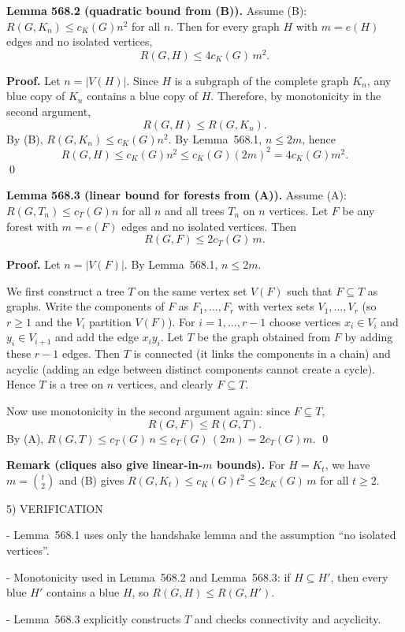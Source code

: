 \medskip

\textbf{Lemma 568.2 (quadratic bound from (B)).}
Assume (B): $R(G,K_n)\le c_K(G)n^2$ for all $n$. Then for every graph $H$ with $m=e(H)$ edges and no isolated vertices,
\[
R(G,H) \le 4c_K(G)\,m^2.
\]

\textbf{Proof.}
Let $n=|V(H)|$. Since $H$ is a subgraph of the complete graph $K_n$, any blue copy of $K_n$ contains a blue copy of $H$. Therefore, by monotonicity in the second argument,
\[
R(G,H) \le R(G,K_n).
\]
By (B), $R(G,K_n)\le c_K(G)n^2$. By Lemma~568.1, $n\le 2m$, hence
\[
R(G,H) \le c_K(G)n^2 \le c_K(G)(2m)^2 = 4c_K(G)m^2.
\]
\qed

\medskip

\textbf{Lemma 568.3 (linear bound for forests from (A)).}
Assume (A): $R(G,T_n)\le c_T(G)n$ for all $n$ and all trees $T_n$ on $n$ vertices. Let $F$ be any forest with $m=e(F)$ edges and no isolated vertices. Then
\[
R(G,F) \le 2c_T(G)\,m.
\]

\textbf{Proof.}
Let $n=|V(F)|$. By Lemma~568.1, $n\le 2m$.

We first construct a tree $T$ on the same vertex set $V(F)$ such that $F\subseteq T$ as graphs. Write the components of $F$ as $F_1,\dots,F_r$ with vertex sets $V_1,\dots,V_r$ (so $r\ge 1$ and the $V_i$ partition $V(F)$). For $i=1,\dots,r-1$ choose vertices $x_i\in V_i$ and $y_i\in V_{i+1}$ and add the edge $x_iy_i$. Let $T$ be the graph obtained from $F$ by adding these $r-1$ edges. Then $T$ is connected (it links the components in a chain) and acyclic (adding an edge between distinct components cannot create a cycle). Hence $T$ is a tree on $n$ vertices, and clearly $F\subseteq T$.

Now use monotonicity in the second argument again: since $F\subseteq T$,
\[
R(G,F) \le R(G,T).
\]
By (A), $R(G,T)\le c_T(G)\,n \le c_T(G)\,(2m)=2c_T(G)m$.
\qed

\medskip

\textbf{Remark (cliques also give linear-in-$m$ bounds).}
For $H=K_t$, we have $m=\binom t2$ and (B) gives $R(G,K_t)\le c_K(G)t^2\le 2c_K(G)\,m$ for all $t\ge 2$.

5) VERIFICATION

- Lemma~568.1 uses only the handshake lemma and the assumption ``no isolated vertices''.

- Monotonicity used in Lemma~568.2 and Lemma~568.3: if $H\subseteq H'$, then every blue $H'$ contains a blue $H$, so $R(G,H)\le R(G,H')$.

- Lemma~568.3 explicitly constructs $T$ and checks connectivity and acyclicity.

